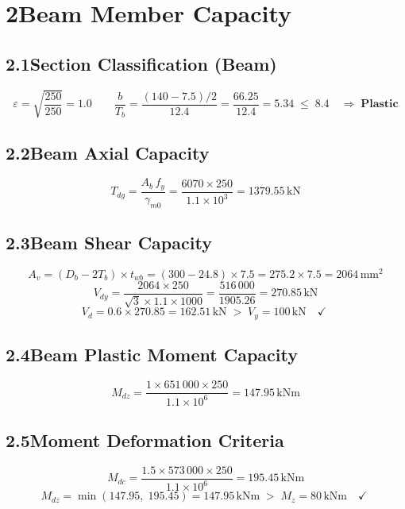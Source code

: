 \documentclass[12pt,a4paper]{article}
\newcommand{\kN}{\,\text{kN}}
\newcommand{\kNm}{\,\text{kNm}}
\newcommand{\mmsq}{\,\text{mm}^2}
\begin{document}
\section{2\quad Beam Member Capacity}

\subsection{2.1\quad Section Classification (Beam)}
\[
  \varepsilon = \sqrt{\frac{250}{250}} = 1.0
  \qquad
  \frac{b}{T_b} = \frac{(140-7.5)/2}{12.4} = \frac{66.25}{12.4} = 5.34
  \;\leq\; 8.4 \quad\Rightarrow\;\textbf{Plastic}
\]

\subsection{2.2\quad Beam Axial Capacity}
\[
  T_{dg} = \frac{A_b\,f_y}{\gamma_{m0}}
         = \frac{6070\times 250}{1.1\times 10^3}
         = \boxed{1379.55\kN}
  \tag{IS 800 Cl.6.2}
\]

\subsection{2.3\quad Beam Shear Capacity}
\[
  A_v = (D_b - 2T_b)\times t_{wb}
      = (300 - 24.8)\times 7.5
      = 275.2\times 7.5
      = 2064\mmsq
\]
\[
  V_{dy} = \frac{2064\times 250}{\sqrt{3}\times 1.1\times 1000}
         = \frac{516\,000}{1905.26}
         = \boxed{270.85\kN}
  \tag{IS 800 Cl.10.4.3}
\]
\[
  V_d = 0.6\times 270.85 = 162.51\kN \;>\; V_y = 100\kN
  \quad\checkmark\;
\]

\subsection{2.4\quad Beam Plastic Moment Capacity}
\[
  M_{dz} = \frac{1\times 651\,000\times 250}{1.1\times 10^6}
          = \boxed{147.95\kNm}
\]

\subsection{2.5\quad Moment Deformation Criteria}
\[
  M_{dc} = \frac{1.5\times 573\,000\times 250}{1.1\times 10^6}
          = \boxed{195.45\kNm}
\]
\[
  M_{dz} = \min(147.95,\;195.45) = \boxed{147.95\kNm}
  \;>\; M_z = 80\kNm \quad\checkmark\;
\]

\end{document}

